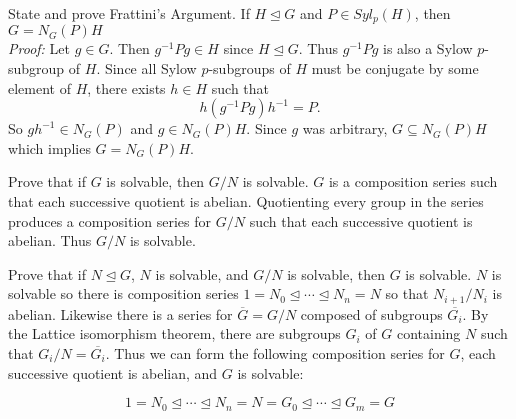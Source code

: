 \documentclass[avery5371,grid]{flashcards}
\newcommand{\inv}{^{-1}}
\begin{document}
\begin{flashcard}[Groups]{State and prove Frattini's Argument.}
 If $H \trianglelefteq G$ and $P \in Syl_p(H)$, then $G = N_G(P)H$\\
 
 \emph{Proof: } Let $g \in G$. Then $g \inv P g \in H$ since $H \trianglelefteq G$. Thus $g \inv P g$ is also a Sylow $p$-subgroup of $H$. Since all Sylow $p$-subgroups of $H$ must be conjugate by some element of $H$, there exists $h \in H$ such that
 $$ h (g \inv P g) h \inv = P.$$
 So $g h \inv \in N_G(P)$ and $g \in N_G(P)H$. Since $g$ was arbitrary, $G \subseteq N_G(P)H$ which implies $G = N_G(P)H.$
\end{flashcard}


\begin{flashcard}[Groups]{Prove that if $G$ is solvable, then $G/N$ is solvable.}
 $G$ is a composition series such that each successive quotient is abelian. Quotienting every group in the series produces a composition series for $G/N$ such that each successive quotient is abelian. Thus $G/N$ is solvable. 
\end{flashcard}


\begin{flashcard}[Groups]{Prove that if $N \trianglelefteq G$, $N$ is solvable, and $G/N$ is solvable, then $G$ is solvable.}
 $N$ is solvable so there is composition series $1 = N_0 \trianglelefteq \cdots \trianglelefteq N_n = N$ so that $N_{i+1}/N_i$ is abelian. Likewise there is a series for $\overline{G} = G/N$ composed of subgroups $\overline{G_i}$. By the Lattice isomorphism theorem, there are subgroups $G_i$ of $G$ containing $N$ such that $G_i /N = \overline{G_i}$. Thus we can form the following composition series for $G$, each successive quotient is abelian, and $G$ is solvable:
 
 $$1 = N_0 \trianglelefteq \cdots \trianglelefteq N_n = N = G_0 \trianglelefteq \cdots \trianglelefteq G_m = G$$
\end{flashcard}
\end{document}
